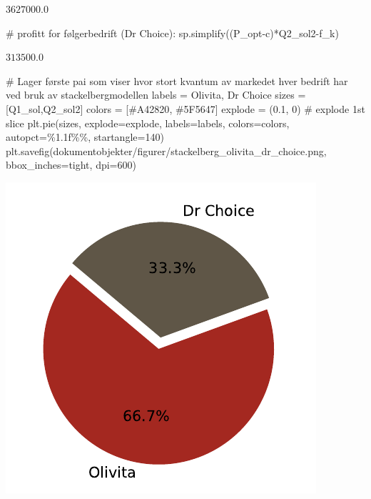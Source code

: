 \documentclass[
  12pt,
  a4paper,
  DIV=11,
  numbers=noendperiod]{scrartcl}
\newenvironment{Shaded}{\begin{snugshade}}{\end{snugshade}}
\newcommand{\CommentTok}[1]{\textcolor[rgb]{0.37,0.37,0.37}{#1}}
\newcommand{\DecValTok}[1]{\textcolor[rgb]{0.68,0.00,0.00}{#1}}
\newcommand{\FloatTok}[1]{\textcolor[rgb]{0.68,0.00,0.00}{#1}}
\newcommand{\NormalTok}[1]{\textcolor[rgb]{0.00,0.23,0.31}{#1}}
\newcommand{\OperatorTok}[1]{\textcolor[rgb]{0.37,0.37,0.37}{#1}}
\newcommand{\SpecialCharTok}[1]{\textcolor[rgb]{0.37,0.37,0.37}{#1}}
\newcommand{\StringTok}[1]{\textcolor[rgb]{0.13,0.47,0.30}{#1}}
\begin{document}
$\displaystyle 3627000.0$

\begin{Shaded}
\begin{Highlighting}[]
\CommentTok{\# profitt for følgerbedrift (Dr Choice):}
\NormalTok{sp.simplify((P\_opt}\OperatorTok{{-}}\NormalTok{c)}\OperatorTok{*}\NormalTok{Q2\_sol2}\OperatorTok{{-}}\NormalTok{f\_k)}
\end{Highlighting}
\end{Shaded}

$\displaystyle 313500.0$

\begin{Shaded}
\begin{Highlighting}[]
\CommentTok{\# Lager første pai som viser hvor stort kvantum av markedet hver bedrift har ved bruk av stackelbergmodellen}
\NormalTok{labels }\OperatorTok{=} \StringTok{\textquotesingle{}Olivita\textquotesingle{}}\NormalTok{, }\StringTok{\textquotesingle{}Dr Choice\textquotesingle{}}
\NormalTok{sizes }\OperatorTok{=}\NormalTok{ [Q1\_sol,Q2\_sol2]}
\NormalTok{colors }\OperatorTok{=}\NormalTok{ [}\StringTok{\textquotesingle{}\#A42820\textquotesingle{}}\NormalTok{, }\StringTok{\textquotesingle{}\#5F5647\textquotesingle{}}\NormalTok{]}
\NormalTok{explode }\OperatorTok{=}\NormalTok{ (}\FloatTok{0.1}\NormalTok{, }\DecValTok{0}\NormalTok{)  }\CommentTok{\# explode 1st slice}
\NormalTok{plt.pie(sizes, explode}\OperatorTok{=}\NormalTok{explode, labels}\OperatorTok{=}\NormalTok{labels, colors}\OperatorTok{=}\NormalTok{colors, autopct}\OperatorTok{=}\StringTok{\textquotesingle{}}\SpecialCharTok{\%1.1f\%\%}\StringTok{\textquotesingle{}}\NormalTok{, startangle}\OperatorTok{=}\DecValTok{140}\NormalTok{)}
\NormalTok{plt.savefig(}\StringTok{\textquotesingle{}dokumentobjekter/figurer/stackelberg\_olivita\_dr\_choice.png\textquotesingle{}}\NormalTok{, bbox\_inches}\OperatorTok{=}\StringTok{\textquotesingle{}tight\textquotesingle{}}\NormalTok{, dpi}\OperatorTok{=}\DecValTok{600}\NormalTok{)}
\end{Highlighting}
\end{Shaded}

\includegraphics{Kandidatnummer_30_mappeoppgave_2_SOK_2030_files/figure-pdf/cell-11-output-1.pdf}
\end{document}
